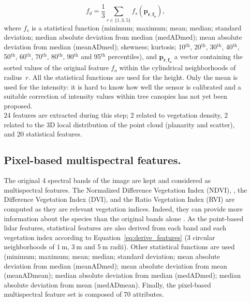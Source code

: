 \begin{equation}
f_{d} = \frac{1}{3}\sum_{r \in \{1,3,5\}}f_{s}(\mathbf{p_{r,f_{o}}}), 
\label{eq:derive_features}
\end{equation}
where $f_{s}$ is a statistical function (minimum; maximum; mean; median; standard deviation; median absolute deviation from median (medADmed); mean absolute deviation from median (meanADmed); skewness; kurtosis; 10$^{\text{th}}$, 20$^{\text{th}}$, 30$^{\text{th}}$, 40$^{\text{th}}$, 50$^{\text{th}}$, 60$^{\text{th}}$, 70$^{\text{th}}$, 80$^{\text{th}}$, 90$^{\text{th}}$ and 95$^{\text{th}}$ percentiles), and $\mathbf{p_{r,f_{o}}}$ a vector containing the sorted values of the original feature $f_{o}$ within the cylindrical neighborhoods of radius~$r$. All the statistical functions are used for the height. Only the mean is used for the intensity: it is hard to know how well the sensor is calibrated and a suitable correction of intensity values within tree canopies has not yet been proposed. \\
24 features are extracted during this step; 2 related to vegetation density, 2 related to the 3D local distribution of the point cloud (planarity and scatter), and 20 statistical features.

\subsection{Pixel-based multispectral features.}
The original 4 spectral bands of the image are kept and considered as multispectral features. The Normalized Difference Vegetation Index (NDVI), \citep{tucker1979red},
the Difference Vegetation Index (DVI), \citep{bacour2006normalization}
and the Ratio Vegetation Index (RVI) \citep{jordan1969derivation}
are computed as they are relevant vegetation indices. Indeed, they can provide more information about the species than the original bands alone \citep{zargar2011review}. As the point-based lidar features, statistical features are also derived from each band and each vegetation index according to Equation~\ref{eq:derive_features} (3 circular neighborhoods of 1$\:$m, 3$\:$m and 5$\:$m radii). Other statistical functions are used (minimum; maximum; mean; median; standard deviation; mean absolute deviation from median (meanADmed); mean absolute deviation from mean (meanADmean); median absolute deviation from median (medADmed); median absolute deviation from mean (medADmean). Finally, the pixel-based multispectral feature set is composed of 70 attributes.

